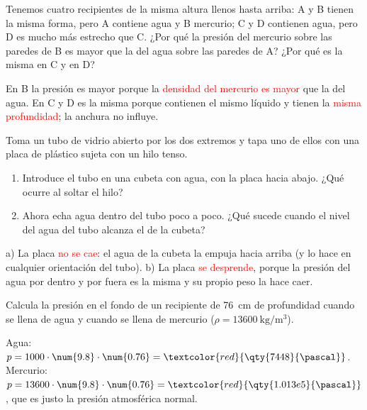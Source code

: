 \begin{exercise}
    Tenemos cuatro recipientes de la misma altura llenos hasta arriba: A y B tienen la misma forma, pero A contiene agua y B mercurio; C y D contienen agua, pero D es mucho más estrecho que C. ¿Por qué la presión del mercurio sobre las paredes de B es mayor que la del agua sobre las paredes de A? ¿Por qué es la misma en C y en D?
    \begin{solu}
        En B la presión es mayor porque la \textcolor{red}{densidad del mercurio es mayor} que la del agua. En C y D es la misma porque contienen el mismo líquido y tienen la \textcolor{red}{misma profundidad}; la anchura no influye.
    \end{solu}
\end{exercise}

\begin{exercise}
    Toma un tubo de vidrio abierto por los dos extremos y tapa uno de ellos con una placa de plástico sujeta con un hilo tenso.
    \begin{enumerate}[label=\alph*)]
        \item Introduce el tubo en una cubeta con agua, con la placa hacia abajo. ¿Qué ocurre al soltar el hilo?
        \item Ahora echa agua dentro del tubo poco a poco. ¿Qué sucede cuando el nivel del agua del tubo alcanza el de la cubeta?
    \end{enumerate}
    \begin{solu}
        a) La placa \textcolor{red}{no se cae}: el agua de la cubeta la empuja hacia arriba (y lo hace en cualquier orientación del tubo).
        b) La placa \textcolor{red}{se desprende}, porque la presión del agua por dentro y por fuera es la misma y su propio peso la hace caer.
    \end{solu}
\end{exercise}

\begin{exercise}
    Calcula la presión en el fondo de un recipiente de \qty{76}{\cm} de profundidad cuando se llena de agua y cuando se llena de mercurio (\(\rho = \qty{13600}{\kg\per\cubic\m}\)).
    \begin{solu}
        Agua: \(p = 1000 \cdot \num{9.8} \cdot \num{0.76} = \textcolor{red}{\qty{7448}{\pascal}}\).
        Mercurio: \(p = 13600 \cdot \num{9.8} \cdot \num{0.76} = \textcolor{red}{\qty{1.013e5}{\pascal}}\), que es justo la presión atmosférica normal.
    \end{solu}
\end{exercise}

